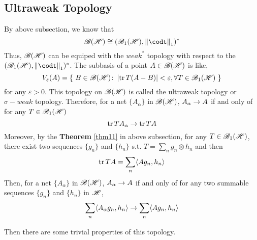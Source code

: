 \subsection{Ultraweak Topology}

By above subsection, we know that
\begin{equation*}
	\oper \cong \st{(\toper, \norm{\codt}_1)}
\end{equation*}
Thus, $\mathscr{B(H)}$ can be equiped with the $weak^{*}$ topology with respect to the $\st{(\toper, \norm{\codt}_1)}$. The subbasis of a point $A \in \mathscr{B(H)}$ is like,
\begin{equation*}
	V_{\varepsilon}(A) = \{~B \in \mathscr{B(H)} \colon \left\lvert\operatorname{tr}{T(A-B)}\right\lvert < \varepsilon, \forall T \in \mathscr{B}_{1}\mathscr{(H)}~\}
\end{equation*}
for any $\varepsilon > 0$. This topology on $\mathscr{B(H)}$ is called the ultraweak topology or $\sigma-weak$ topology. Therefore, for a net $\{A_{\alpha}\}$ in $\mathscr{B(H)}$, $A_{\alpha} \rightarrow A$ if and only of for any $T \in \mathscr{B}_{1}\mathscr{(H)}$
\begin{equation*}
	\operatorname{tr}{TA_{\alpha}} \rightarrow \operatorname{tr}{TA}
\end{equation*}
Moreover, by the \textbf{Theorem} \ref{thm11} in above subsection, for any $T \in \mathscr{B}_{1}\mathscr{(H)}$, there exist two sequences $\{g_n\}$ and $\{h_n\}$ s.t. $T = \sum_n g_n \otimes h_n$ and then
\begin{equation*}
	\operatorname{tr}{TA} = \sum_n \langle A g_n, h_n \rangle
\end{equation*}
Then, for a net $\{A_{\alpha}\}$ in $\mathscr{B(H)}$, $A_{\alpha} \rightarrow A$ if and only of for any two summable sequences $\{g_n\}$ and $\{h_n\}$ in $\mathscr{H}$, 
\begin{equation*}
	\sum_n \langle A_{\alpha} g_n, h_n \rangle \rightarrow \sum_n \langle A g_n, h_n \rangle
\end{equation*}

Then there are some trivial properties of this topology.

